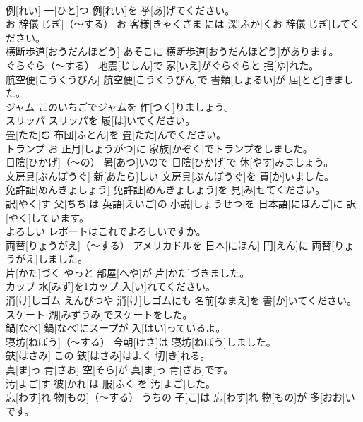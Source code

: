 \documentclass[8pt]{extreport}
\begin{document}
\begin{CJK}{UTF8}{min}
\\	例[れい]	一[ひと]つ 例[れい]を 挙[あ]げてください。		
\\	お 辞儀[じぎ]（～する）	お 客様[きゃくさま]には 深[ふか]くお 辞儀[じぎ]してください。		
\\	横断歩道[おうだんほどう]	あそこに 横断歩道[おうだんほどう]があります。		
\\	ぐらぐら（～する）	地震[じしん]で 家[いえ]がぐらぐらと 揺[ゆ]れた。		
\\	航空便[こうくうびん]	航空便[こうくうびん]で 書類[しょるい]が 届[とど]きました。		
\\	ジャム	このいちごでジャムを 作[つく]りましょう。		
\\	スリッパ	スリッパを 履[は]いてください。		
\\	畳[たた]む	布団[ふとん]を 畳[たた]んでください。		
\\	トランプ	お 正月[しょうがつ]に 家族[かぞく]でトランプをしました。		
\\	日陰[ひかげ]（～の）	暑[あつ]いので 日陰[ひかげ]で 休[やす]みましょう。		
\\	文房具[ぶんぼうぐ]	新[あたら]しい 文房具[ぶんぼうぐ]を 買[か]いました。		
\\	免許証[めんきょしょう]	免許証[めんきょしょう]を 見[み]せてください。		
\\	訳[やく]す	父[ちち]は 英語[えいご]の 小説[しょうせつ]を 日本語[にほんご]に 訳[やく]しています。		
\\	よろしい	レポートはこれでよろしいですか。		
\\	両替[りょうがえ]（～する）	アメリカドルを 日本[にほん] 円[えん]に 両替[りょうがえ]しました。		
\\	片[かた]づく	やっと 部屋[へや]が 片[かた]づきました。		
\\	カップ	水[みず]を1カップ 入[い]れてください。		
\\	消[け]しゴム	えんぴつや 消[け]しゴムにも 名前[なまえ]を 書[か]いてください。		
\\	スケート	湖[みずうみ]でスケートをした。		
\\	鍋[なべ]	鍋[なべ]にスープが 入[はい]っているよ。		
\\	寝坊[ねぼう]（～する）	今朝[けさ]は 寝坊[ねぼう]しました。		
\\	鋏[はさみ]	この 鋏[はさみ]はよく 切[き]れる。		
\\	真[ま]っ 青[さお]	空[そら]が 真[ま]っ 青[さお]です。		
\\	汚[よご]す	彼[かれ]は 服[ふく]を 汚[よご]した。		
\\	忘[わす]れ 物[もの]（～する）	うちの 子[こ]は 忘[わす]れ 物[もの]が 多[おお]いです。		

\end{CJK}
\end{document}
